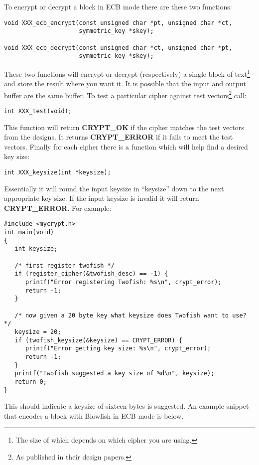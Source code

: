 \documentclass{book}
\begin{document}
To encrypt or decrypt a block in ECB mode there are these two functions:
 
\begin{verbatim}
void XXX_ecb_encrypt(const unsigned char *pt, unsigned char *ct,
                     symmetric_key *skey);

void XXX_ecb_decrypt(const unsigned char *ct, unsigned char *pt,
                     symmetric_key *skey);
\end{verbatim}
These two functions will encrypt or decrypt (respectively) a single block of text\footnote{The size of which depends on
which cipher you are using.} and store the result where you want it.  It is possible that the input and output buffer are the same buffer.  To test
a particular cipher against test vectors\footnote{As published in their design papers.} call: 
\begin{verbatim}
int XXX_test(void);
\end{verbatim}
This function will return {\bf CRYPT\_OK} if the cipher matches the test vectors from the designs.  It returns
{\bf CRYPT\_ERROR} if it fails to meet the test vectors.  Finally for each cipher there is a function which will help
find a desired key size:
\begin{verbatim}
int XXX_keysize(int *keysize);
\end{verbatim}
Essentially it will round the input keysize in ``keysize'' down to the next appropriate key size.  If the input keysize
is invalid it will return {\bf CRYPT\_ERROR}.  For example:
\begin{small}
\begin{verbatim}
#include <mycrypt.h>
int main(void)
{
   int keysize;

   /* first register twofish */
   if (register_cipher(&twofish_desc) == -1) {
      printf("Error registering Twofish: %s\n", crypt_error);
      return -1;
   }

   /* now given a 20 byte key what keysize does Twofish want to use? */
   keysize = 20;
   if (twofish_keysize(&keysize) == CRYPT_ERROR) {
      printf("Error getting key size: %s\n", crypt_error);
      return -1;
   }
   printf("Twofish suggested a key size of %d\n", keysize);
   return 0;
}
\end{verbatim}
\end{small}
This should indicate a keysize of sixteen bytes is suggested.  An example snippet that encodes a block with 
Blowfish in ECB mode is below.
\end{document}

